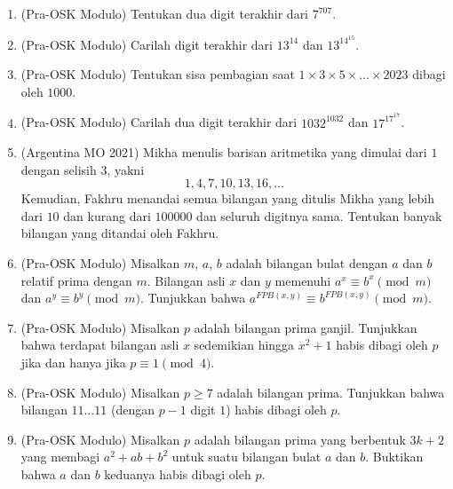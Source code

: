 \documentclass[12pt]{scrartcl}
\begin{document}
\begin{enumerate}[resume]
	\item (Pra-OSK Modulo)
	Tentukan dua digit terakhir dari $7^{707}$.

	\item (Pra-OSK Modulo)
	Carilah digit terakhir dari $13^{14}$ dan $13^{14^{15}}$.

	\item (Pra-OSK Modulo)
	Tentukan sisa pembagian saat $1 \times 3 \times 5 \times \dots \times 2023$ dibagi oleh $1000$.

	\item (Pra-OSK Modulo)
	Carilah dua digit terakhir dari $1032^{1032}$ dan $17^{17^{17}}$.

	\item (Argentina MO 2021)
	Mikha menulis barisan aritmetika yang dimulai dari $1$ dengan selisih $3$, yakni
	\[ 1, 4, 7, 10, 13, 16, \ldots \]
	Kemudian, Fakhru menandai semua bilangan yang ditulis Mikha yang lebih dari $10$
	dan kurang dari $100000$ dan seluruh digitnya sama.
	Tentukan banyak bilangan yang ditandai oleh Fakhru.

	\item (Pra-OSK Modulo)
	Misalkan $m$, $a$, $b$ adalah bilangan bulat dengan $a$ dan $b$ relatif prima dengan $m$.
	Bilangan asli $x$ dan $y$ memenuhi $a^x \equiv b^x \pmod{m}$ dan $a^y \equiv b^y \pmod{m}$.
	Tunjukkan bahwa $a^{FPB(x, y)} \equiv b^{FPB(x, y)} \pmod{m}$.

	\item (Pra-OSK Modulo)
	Misalkan $p$ adalah bilangan prima ganjil.
	Tunjukkan bahwa terdapat bilangan asli $x$ sedemikian hingga $x^2 + 1$
	habis dibagi oleh $p$ jika dan hanya jika $p \equiv 1 \pmod{4}$.

	\item (Pra-OSK Modulo)
	Misalkan $p \ge 7$ adalah bilangan prima.
	Tunjukkan bahwa bilangan $11\ldots11$ (dengan $p - 1$ digit $1$) habis dibagi oleh $p$.

	\item (Pra-OSK Modulo)
	Misalkan $p$ adalah bilangan prima yang berbentuk $3k + 2$ yang membagi $a^2 + ab + b^2$
	untuk suatu bilangan bulat $a$ dan $b$.
	Buktikan bahwa $a$ dan $b$ keduanya habis dibagi oleh $p$.


\end{enumerate}
\end{document}
